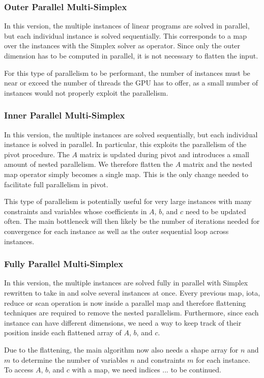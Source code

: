\subsubsection{Outer Parallel Multi-Simplex}
In this version, the multiple instances of linear programs are solved in parallel, but each individual instance is solved sequentially. This corresponds to a map over the instances with the Simplex solver as operator. Since only the outer dimension has to be computed in parallel, it is not necessary to flatten the input.

For this type of parallelism to be performant, the number of instances must be near or exceed the number of threads the GPU has to offer, as a small number of instances would not properly exploit the parallelism.

\subsubsection{Inner Parallel Multi-Simplex}
In this version, the multiple instances are solved sequentially, but each individual instance is solved in parallel. In particular, this exploits the parallelism of the pivot procedure. The $A$ matrix is updated during pivot and introduces a small amount of nested parallelism. We therefore flatten the $A$ matrix and the nested map operator simply becomes a single map. This is the only change needed to facilitate full parallelism in pivot.

This type of parallelism is potentially useful for very large instances with many constraints and variables whose coefficients in $A$, $b$, and $c$ need to be updated often. The main bottleneck will then likely be the number of iterations needed for convergence for each instance as well as the outer sequential loop across instances.

\subsubsection{Fully Parallel Multi-Simplex}
In this version, the multiple instances are solved fully in parallel with Simplex rewritten to take in and solve several instances at once. Every previous map, iota, reduce or scan operation is now inside a parallel map and therefore flattening techniques are required to remove the nested parallelism. Furthermore, since each instance can have different dimensions, we need a way to keep track of their position inside each flattened array of $A$, $b$, and $c$.

\newpar
Due to the flattening, the main algorithm now also needs a shape array for $n$ and $m$ to determine the number of variables $n$ and constraints $m$ for each instance. To access $A$, $b$, and $c$ with a map, we need indices ... to be continued.

